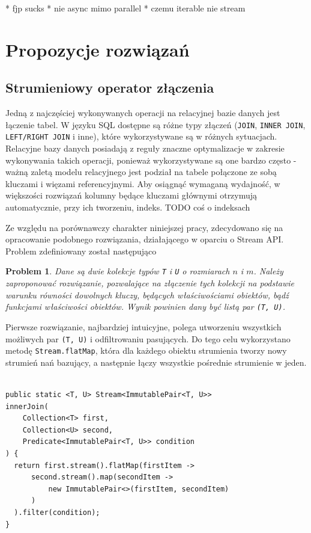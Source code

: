 \documentclass[12pt]{extarticle}
\newtheorem{theorem}{Problem}
\begin{document}
* fjp sucks
* nie async mimo parallel
* czemu iterable nie stream

\section{Propozycje rozwiązań}

\subsection{Strumieniowy operator złączenia}

    Jedną z najczęściej wykonywanych operacji na relacyjnej bazie danych jest łączenie tabel. W języku SQL dostępne są różne typy złączeń (\texttt{JOIN}, \texttt{INNER JOIN}, \texttt{LEFT/RIGHT JOIN} i inne), które wykorzystywane są w różnych sytuacjach. Relacyjne bazy danych posiadają z reguły znaczne optymalizacje w zakresie wykonywania takich operacji, ponieważ wykorzystywane są one bardzo często - ważną zaletą modelu relacyjnego jest podział na tabele połączone ze sobą kluczami i więzami referencyjnymi. Aby osiągnąć wymaganą wydajność, w większości rozwiązań kolumny będące kluczami głównymi otrzymują automatycznie, przy ich tworzeniu, indeks.
    TODO coś o indeksach

    Ze względu na porównawczy charakter niniejszej pracy, zdecydowano się na opracowanie podobnego rozwiązania, działającego w oparciu o Stream API. Problem zdefiniowany został następująco

\begin{theorem}
    Dane są dwie kolekcje typów \texttt{T} i \texttt{U} o rozmiarach $ n $ i $ m $. Należy zaproponować rozwiązanie, pozwalające na złączenie tych kolekcji na podstawie warunku równości dowolnych kluczy, będących właściwościami obiektów, bądź funkcjami właściwości obiektów. Wynik powinien dany być listą par \texttt{(T, U)}.
\end{theorem}

    Pierwsze rozwiązanie, najbardziej intuicyjne, polega utworzeniu wszystkich możliwych par \texttt{(T, U)} i odfiltrowaniu pasujących. Do tego celu wykorzystano metodę \texttt{Stream.flatMap}, która dla każdego obiektu strumienia tworzy nowy strumień nań bazujący, a następnie łączy wszystkie pośrednie strumienie w jeden.

\begin{lstlisting}[label=join1, caption=Rozwiązanie nr 1]

public static <T, U> Stream<ImmutablePair<T, U>>
innerJoin(
    Collection<T> first,
    Collection<U> second,
    Predicate<ImmutablePair<T, U>> condition
) {
  return first.stream().flatMap(firstItem ->
      second.stream().map(secondItem ->
          new ImmutablePair<>(firstItem, secondItem)
      )
  ).filter(condition);
}

\end{lstlisting}
\end{document}
